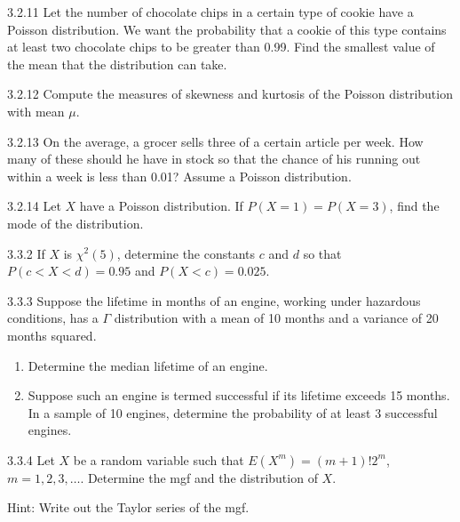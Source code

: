 \begin{exercise}{3.2.11}
Let the number of chocolate chips in a certain type of cookie have a Poisson distribution. We want the probability that a cookie of this type contains at least two chocolate chips to be greater than 0.99. Find the smallest value of the mean that the distribution can take.
\end{exercise}

\begin{exercise}{3.2.12}
Compute the measures of skewness and kurtosis of the Poisson distribution with mean $\mu$.
\end{exercise}

\begin{exercise}{3.2.13}
On the average, a grocer sells three of a certain article per week. How many of these should he have in stock so that the chance of his running out within a week is less than 0.01? Assume a Poisson distribution.
\end{exercise}

\begin{exercise}{3.2.14}
Let $X$ have a Poisson distribution. If $P(X = 1) = P(X = 3)$, find the mode of the distribution.
\end{exercise}

\begin{exercise}{3.3.2}
If $X$ is $\chi^2(5)$, determine the constants $c$ and $d$ so that $P(c < X < d) = 0.95$ and $P(X < c) = 0.025$.
\end{exercise}

\begin{exercise}{3.3.3}
Suppose the lifetime in months of an engine, working under hazardous conditions, has a $\Gamma$ distribution with a mean of 10 months and a variance of 20 months squared.
\begin{enumerate}
\item Determine the median lifetime of an engine.
\item Suppose such an engine is termed successful if its lifetime exceeds 15 months. In a sample of 10 engines, determine the probability of at least 3 successful engines.
\end{enumerate}
\end{exercise}

\begin{exercise}{3.3.4}
Let $X$ be a random variable such that $E(X^m) = (m+1)!2^m$, $m = 1, 2, 3, \ldots$. Determine the mgf and the distribution of $X$.

Hint: Write out the Taylor series of the mgf.
\end{exercise}

